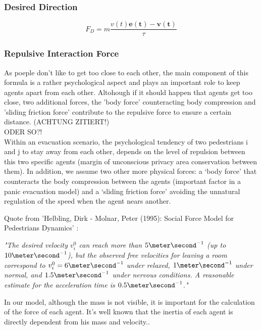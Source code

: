 \documentclass[11pt]{article}
\begin{document}

\subsubsection{Desired Direction}

\begin{equation} \label{eq:eikonal}
F_{D}=m\frac{v(t)\mathbf{e(t)}-\mathbf{v(t)}}{\tau}
\end{equation}

\subsubsection{Repulsive Interaction Force}
As poeple don't like to get too close to each other, the main component of this formula is a rather psychological aspect and plays an important role to keep agents apart from each other. Altohough if it should happen that agents get too close, two additional forces, the 'body force' counteracting body compression and 'sliding friction force' contribute to the repulsive force to ensure a certain distance. (ACHTUNG ZITIERT!) \\
ODER SO?! \\ %
Within an evacuation scenario, the psychological tendency of two pedestrians i
and j to stay away from each other, depends on the level of repulsion between
this two specific agents (margin of unconscious privacy area conservation
between them). In addition, we assume two other more physical forces: a `body
force' that counteracts the body compression between the agents (important
factor in a panic evacuation model) and a `sliding friction force' avoiding the
unnatural regulation of the speed when the agent nears another. \cite{SFMPD}

Quote from 'Helbling, Dirk - Molnar, Peter (1995): Social Force Model for Pedestrians Dynamics' \cite{SFMPD} :
\begin{center}
\textit{"The desired velocity $v^0_i$ can reach more than $5 \meter\second^{-1}$
(up to $10 \meter\second^{-1}$), but the observed free velocities for leaving a 
room correspond to $v^0_i=6 \meter\second^{-1}$ under relaxed, $1\meter\second^{-1}$
under normal, and $1.5\meter\second^{-1}$ under nervous conditions. A reasonable
estimate for the acceleration time is $0.5\meter\second^{-1}$."}
\end{center}
In our model, although the mass is not visible, it is important for
the calculation of the force of each agent. It's well known that the inertia of
each agent is directly dependent from his mass and velocity..
\end{document}
